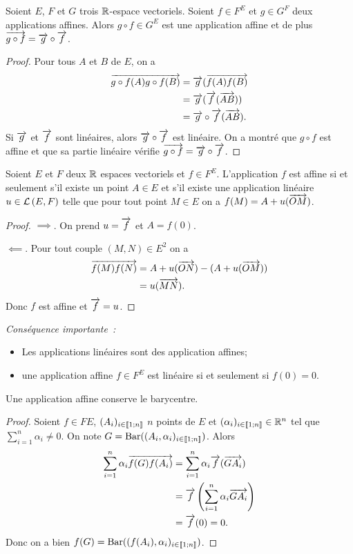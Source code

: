 \begin{prop}
  Soient $E$, $F$ et $G$ trois $\mathbb{R}$-espace vectoriels. Soient $f \in F^E$ et $g \in G^F$ deux applications affines. Alors $g \circ f \in G^E$ est une application affine et de plus $\overrightarrow{g \circ f}=\overrightarrow{g}\circ \overrightarrow{f}$.
\end{prop}
\begin{proof}
  Pour tous $A$ et $B$ de $E$, on a
  \begin{align}
    \overrightarrow{g\circ f(A) g\circ f(B)} &= \overrightarrow{g} (\overrightarrow{f(A)f(B)} \\
    &=\overrightarrow{g}(\overrightarrow{f}(\overrightarrow{AB})) \\
    &=\overrightarrow{g}\circ \overrightarrow{f} (\overrightarrow{AB}).
  \end{align}
  Si $\overrightarrow{g}$ et $\overrightarrow{f}$ sont linéaires, alors $\overrightarrow{g}\circ \overrightarrow{f}$ est linéaire. On a montré que $g \circ f$ est affine et que sa partie linéaire vérifie $\overrightarrow{g \circ f}=\overrightarrow{g}\circ \overrightarrow{f}$.
\end{proof}

\begin{prop}
  Soient $E$ et $F$ deux $\mathbb{R}$ espaces vectoriels et $f \in F^E$. L'application $f$ est affine si et seulement s'il existe un point $A\in E$ et s'il existe une application linéaire $u \in \mathcal{L}\left(E,F\right)$ telle que pour tout point $M \in E$ on a $f(M)=A+u(\overrightarrow{OM})$.
\end{prop}
\begin{proof}
  $\implies$. On prend $u=\overrightarrow{f}$ et $A=f(0)$.

  $\impliedby$. Pour tout couple $(M, N) \in E^2$ on a
  \begin{align}
    \overrightarrow{f(M)f(N)} &= A+u(\overrightarrow{ON}) - (A+u(\overrightarrow{OM})) \\
    &=u(\overrightarrow{MN}).
  \end{align}
  Donc $f$ est affine et $\overrightarrow{f}=u$.
\end{proof}

\emph{Conséquence importante~:}
\begin{itemize}
\item Les applications linéaires sont des application affines;
\item une application affine $f \in F^E$ est linéaire si et seulement si $f(0)=0$.
\end{itemize}

\begin{prop}
  Une application affine conserve le barycentre.
\end{prop}
\begin{proof}
  Soient $f \in FE$, $(A_i)_{i \in \mathopen{\llbracket}1\mathclose{}\mathpunct{};n\mathclose{\rrbracket}}$ $n$ points de $E$ et $(\alpha_i)_{i \in \mathopen{\llbracket}1\mathclose{}\mathpunct{};n\mathclose{\rrbracket}} \in \mathbb{R}^n$ tel que $\sum_{i=1}^n\alpha_i\neq 0$. On note $G=\operatorname{Bar}((A_i,\alpha_i)_{i \in \mathopen{\llbracket}1\mathclose{}\mathpunct{};n\mathclose{\rrbracket}})$. Alors
  \begin{align}
    \sum_{i=1}^n \alpha_i \overrightarrow{f(G)f(A_i)} &= \sum_{i=1}^n \alpha_i \overrightarrow{f}(\overrightarrow{GA_i}) \\
    &=\overrightarrow{f}\left(\sum_{i=1}^n \alpha_i \overrightarrow{GA_i}\right) \\
    &=\overrightarrow{f}(0)=0.
  \end{align}
  Donc on a bien $f(G)=\operatorname{Bar}((f(A_i),\alpha_i)_{i \in \mathopen{\llbracket}1\mathclose{}\mathpunct{};n\mathclose{\rrbracket}})$.
\end{proof}

